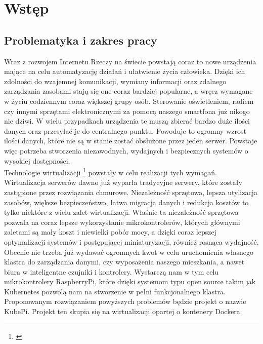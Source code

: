 \documentclass[12pt]{report}
\let\Oldsection\section
\renewcommand{\section}{\FloatBarrier\Oldsection}
\begin{document}


\tableofcontents    %

\chapter{Wstęp}\label{chap:wstep}
\section{Problematyka i zakres pracy}
Wraz z rozwojem Internetu Rzeczy na świecie powstają coraz to nowe urządzenia mające na celu automatyzację działań i ułatwienie życia człowieka. Dzięki ich zdolności do wzajemnej komunikacji, wymiany informacji oraz zdalnego zarządzania zasobami stają się one coraz bardziej popularne, a wręcz wymagane w życiu codziennym coraz większej grupy osób. Sterowanie oświetleniem, radiem czy innymi sprzętami elektronicznymi za pomocą naszego smartfona już nikogo nie dziwi. W wielu przypadkach urządzenia te muszą zbierać bardzo duże ilości danych oraz przesyłać je do centralnego punktu. Powoduje to ogromny wzrost ilości danych, które nie są w stanie zostać obsłużone przez jeden serwer. Powstaje więc potrzeba stworzenia niezawodnych, wydajnych i bezpiecznych systemów o wysokiej dostępności. \\
\indent Technologie wirtualizacji
\footnote{\cite{virtualization}}
powstały w celu realizacji tych wymagań. Wirtualizacja serwerów dawno już wyparła tradycyjne serwery, które zostały zastąpione przez rozwiązania chmurowe. Niezależność sprzętowa, lepsza utylizacja zasobów, większe bezpieczeństwo, łatwa migracja danych i redukcja kosztów to tylko niektóre z wielu zalet wirtualizacji. Właśnie ta niezależność sprzętowa pozwala na coraz lepsze wykorzystanie mikrokontrolerów, których głównymi zaletami są mały koszt i niewielki pobór mocy, a dzięki coraz lepszej optymalizacji systemów i postępującej miniaturyzacji, również rosnąca wydajność. \\
	\indent Obecnie nie trzeba już wydawać ogromnych kwot w celu uruchomienia własnego klastra do zarządzania danymi, czy wyposażenia naszego mieszkania, a nawet biura w inteligentne czujniki i kontrolery. Wystarczą nam w tym celu mikrokontrolery RaspberryPi, które dzięki systemom typu open source takim jak Kubernetes pozwolą nam na stworzenie w pełni funkcjonalnego klastra. \\
	\indent Proponowanym rozwiązaniem powyższych problemów będzie projekt o nazwie KubePi. Projekt ten skupia się na wirtualizacji opartej o kontenery Dockera
\end{document}
